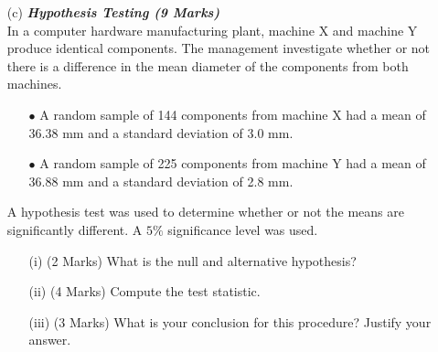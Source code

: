 \documentclass[]{article}
\begin{document}
\begin{itemize}
\bigskip
\item[(c)]  \textbf{\textit{Hypothesis Testing (9 Marks)}}\\
In a computer hardware manufacturing plant, machine X and machine Y produce identical components. The management investigate whether or not there is a difference in the mean diameter of the components from both machines.

\begin{itemize}
\item[$\bullet$] A random sample of 144 components from machine X had a mean of 36.38 mm and a standard deviation of 3.0 mm.
\item[$\bullet$] A random sample of 225 components from machine Y had a mean of 36.88 mm and a standard deviation of 2.8 mm.
\end{itemize}
A hypothesis test was used to determine whether or not the means are significantly different.
A $5\%$ significance level was used.

\begin{itemize}
\item[(i)] (2 Marks) What is the null and alternative hypothesis?
\item[(ii)] (4 Marks) Compute the test statistic.
\item[(iii)] (3 Marks) What is your conclusion for this procedure? Justify your answer.
\end{itemize}

\end{itemize}
\end{document}
